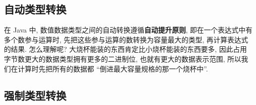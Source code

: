 \documentclass[10pt,UTF8]{book} %
\begin{document}
\subsection{自动类型转换}

在 Java 中, 数值数据类型之间的自动转换遵循\textbf{自动提升原则}, 
即在一个表达式中有多个数参与运算时, 先把这些参与运算的数转换为容量最大的类型, 
再计算表达式的结果. 怎么理解呢? 大烧杯能装的东西肯定比小烧杯能装的东西要多,
因此占用字节数更大的数据类型拥有更多的二进制位, 也就有更大的数据表示范围,
所以我们在计算时先把所有的数据都 “倒进最大容量规格的那一个烧杯中”.

\subsection{强制类型转换}





\end{document}
